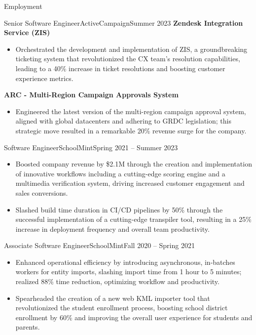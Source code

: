\documentclass[]{mcdowellcv}
\begin{document}
	\makeheader
	\begin{cvsection}{Employment}
		\begin{cvsubsection}{Senior Software Engineer}{ActiveCampaign}{Summer 2023}
			\textbf{Zendesk Integration Service (ZIS)}
			\begin{itemize}
				\item Orchestrated the development and implementation of ZIS, a groundbreaking ticketing system that revolutionized the CX team's resolution capabilities, leading to a 40\% increase in ticket resolutions and boosting customer experience metrics.
			\end{itemize}
			\textbf{ARC - Multi-Region Campaign Approvals System}
			\begin{itemize}
				\item Engineered the latest version of the multi-region campaign approval system, aligned with global datacenters and adhering to GRDC legislation; this strategic move resulted in a remarkable 20\% revenue surge for the company.
			\end{itemize}
		\end{cvsubsection}
		\begin{cvsubsection}{Software Engineer}{SchoolMint}{Spring 2021 -- Summer 2023}		
			\begin{itemize}
				\item Boosted company revenue by \$2.1M through the creation and implementation of innovative workflows including a cutting-edge scoring engine and a multimedia verification system, driving increased customer engagement and sales conversions.
				\item Slashed build time duration in CI/CD pipelines by 50\% through the successful implementation of a cutting-edge transpiler tool, resulting in a 25\% increase in deployment frequency and overall team productivity.
			\end{itemize}
		\end{cvsubsection}
		\begin{cvsubsection}{Associate Software Engineer}{SchoolMint}{Fall 2020 -- Spring 2021}	
			\begin{itemize}
				\item Enhanced operational efficiency by introducing asynchronous, in-batches workers for entity imports, slashing import time from 1 hour to 5 minutes; realized 88\% time reduction, optimizing workflow and productivity.
				\item Spearheaded the creation of a new web KML importer tool that revolutionized the student enrollment process, boosting school district enrollment by 60\% and improving the overall user experience for students and parents.

\end{itemize}
\end{cvsubsection}
\end{cvsection}
\end{document}
